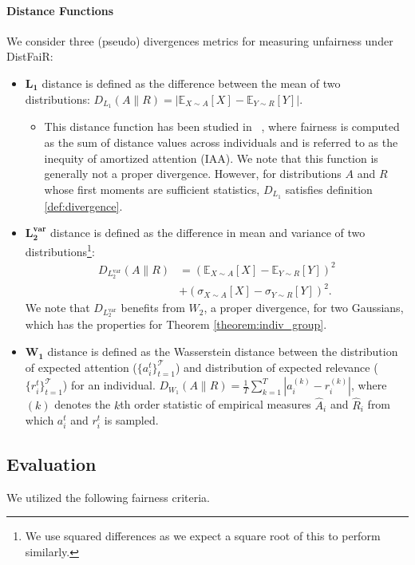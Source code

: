 \paragraph{Distance Functions}
\label{sec:distance_metrics}
We consider three (pseudo) divergences metrics for measuring unfairness under DistFaiR:
\begin{itemize}[leftmargin=0.2in]
    \setlength\itemsep{0em}
    \item $\mathbf{L_1}$ distance is defined as the difference between the mean of two distributions: $D_{L_1}(A \| R) = |\mathbb{E}_{X \sim A}[X] - \mathbb{E}_{Y \sim R}[Y]|$. 
    \begin{itemize}
        \item This distance function has been studied in ~\cite{biega2018equity}, where fairness is computed as the sum of distance values across individuals and is referred to as the inequity of amortized attention (IAA).  We note that this function is generally not a proper divergence. However, for distributions $A$ and $R$ whose first moments are sufficient statistics, $D_{L_1}$ satisfies definition \ref{def:divergence}.
    \end{itemize}
    \item $\mathbf{L_2^{\text{var}}}$ distance is defined as the difference in mean and variance of two distributions\footnote{We use squared differences as we expect a square root of this to perform similarly.}: 
    \begin{align*} D_{L_2^{\text{var}}}(A \| R) &= (\mathbb{E}_{X \sim A}[X] - \mathbb{E}_{Y \sim R}[Y])^2 \\&+ (\sigma{}_{X \sim A}[X] - \sigma_{Y \sim R}[Y])^2.\end{align*}
    We note that $D_{L_2^{\text{var}}}$ benefits from $W_2$, a proper divergence, for two Gaussians, which has the properties for Theorem \ref{theorem:indiv_group}. %
    \item $\mathbf{W_{1}}$ distance is defined as the Wasserstein distance between the distribution of expected attention ($\{a_i^t\}_{t=1}^{\mathcal{T}}$) and distribution of expected relevance ($\{r_i^t\}_{t=1}^{\mathcal{T}}$) for an individual. $D_{W_1}(A \| R)=\frac{1}{T}\sum_{k=1}^{T} |a_i^{(k)} - r_i^{(k)}|$, where $(k)$ denotes the $k$th order statistic of empirical measures $\hat{A}_i$ and $\hat{R}_i$ from which $a_i^t$ and $r_i^t$ is sampled. 
    
\end{itemize}
\subsection{Evaluation}
\label{sec:metrics}
We utilized the following fairness criteria.



